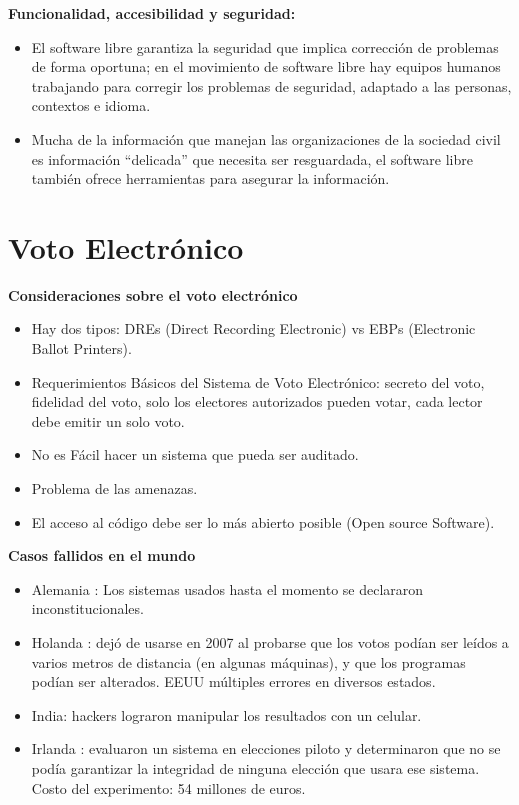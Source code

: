 {\bf Funcionalidad, accesibilidad y seguridad:}
\begin{itemize}
\item El software libre garantiza la seguridad que implica corrección de problemas de forma oportuna; en el movimiento de software libre hay equipos humanos trabajando para corregir los problemas de seguridad, adaptado a las personas, contextos e idioma.
\item   Mucha de la información que manejan las organizaciones de la sociedad civil es
información “delicada” que necesita ser resguardada, el software libre también ofrece herramientas para asegurar la información.
\end{itemize}

\section{Voto Electrónico}

{\bf Consideraciones sobre el voto electrónico}
\begin{itemize}
\item Hay dos tipos: DREs (Direct Recording Electronic)  vs  EBPs (Electronic Ballot Printers).
\item Requerimientos Básicos del Sistema de Voto Electrónico: secreto del voto, fidelidad del voto, solo los electores autorizados pueden votar, cada lector debe emitir un solo voto.
\item No es Fácil hacer un sistema que pueda ser auditado.
\item Problema de las amenazas.
\item El acceso al código debe ser lo más abierto posible (Open source Software).
\end{itemize}

{\bf Casos fallidos en el mundo}

\begin{itemize}
\item Alemania : Los sistemas usados hasta el momento se declararon inconstitucionales.
\item Holanda : dejó de usarse en 2007 al probarse que los votos podían ser leídos a varios metros de distancia (en algunas máquinas), y que los programas podían ser alterados. EEUU múltiples errores en diversos estados.
\item India:  hackers lograron manipular los resultados con un celular. 
\item Irlanda : evaluaron un sistema en elecciones piloto y determinaron que no se podía garantizar la integridad de ninguna elección que usara ese sistema. Costo del experimento: 54 millones de euros.
\end{itemize}

